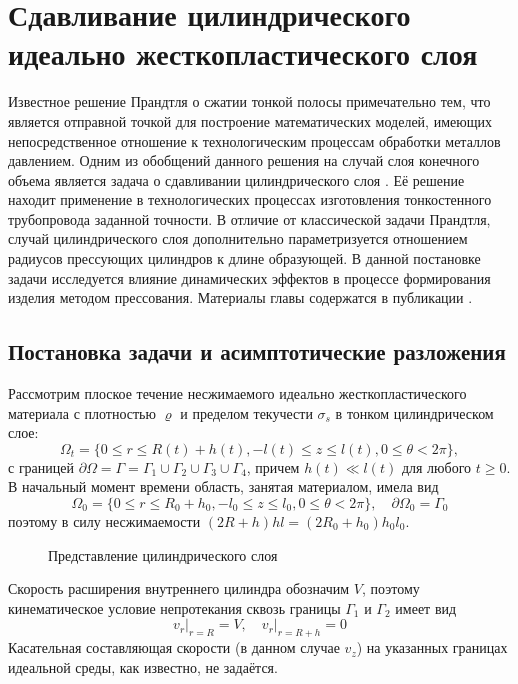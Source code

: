 \chapter{Сдавливание цилиндрического идеально жесткопластического слоя}\label{ch:ch2}
Известное решение Прандтля \autocite{Prandtl:1948} о сжатии тонкой полосы примечательно тем, что является отправной точкой для построение математических моделей, имеющих непосредственное отношение к технологическим процессам обработки металлов давлением. Одним из обобщений данного решения на случай слоя конечного объема является задача о сдавливании цилиндрического слоя \autocite{Georgievsky:2010}. Её решение находит применение в технологических процессах изготовления тонкостенного трубопровода заданной точности. В отличие от классической задачи Прандтля, случай цилиндрического слоя дополнительно параметризуется отношением радиусов прессующих цилиндров к длине образующей. В данной постановке задачи исследуется влияние динамических эффектов в процессе формирования изделия методом прессования. Материалы главы содержатся в публикации \autocite{Shabaykin:2020b}.

\section{Постановка задачи и асимптотические разложения}\label{sec:ch2/sec1}

Рассмотрим плоское течение несжимаемого идеально жесткопластического материала с плотностью $\varrho$ и пределом текучести $\sigma_{s}$ в тонком цилиндрическом слое:
\begin{equation}
  \Omega_{t} = \{0 \le r \le R(t) + h(t), -l(t) \le z \le l(t), 0 \le \theta < 2\pi\},
\end{equation}
с границей $\partial\Omega = \Gamma = \Gamma_{1} \cup \Gamma_{2} \cup \Gamma_{3}\cup \Gamma_{4}$, причем $h(t) \ll l(t)$ для любого $t \ge 0$. В начальный момент времени область, занятая материалом, имела вид
\begin{equation}
  \Omega_{0} = \{0 \le r \le R_{0} + h_{0}, -l_{0} \le z \le l_{0}, 0 \le \theta < 2\pi\}, \quad \partial\Omega_{0} = \Gamma_{0}
\end{equation}
поэтому в силу несжимаемости $(2R+h)hl=(2R_{0}+h_{0})h_{0}l_{0}$.

\begin{figure}[ht]
  \caption{Представление цилиндрического слоя}
  \label{fig:ch2/layer}
\end{figure}
Скорость расширения внутреннего цилиндра обозначим $V$, поэтому кинематическое условие непротекания сквозь границы $\Gamma_{1}$ и $\Gamma_{2}$ имеет вид
\begin{equation}
  \label{eq:ch2/sec1/boundary/kinematic}
  v_{r}\lvert_{r=R} = V, \quad v_{r}\lvert_{r=R+h} = 0
\end{equation}
Касательная составляющая скорости (в данном случае $v_{z}$) на указанных границах идеальной среды, как известно, не задаётся.

